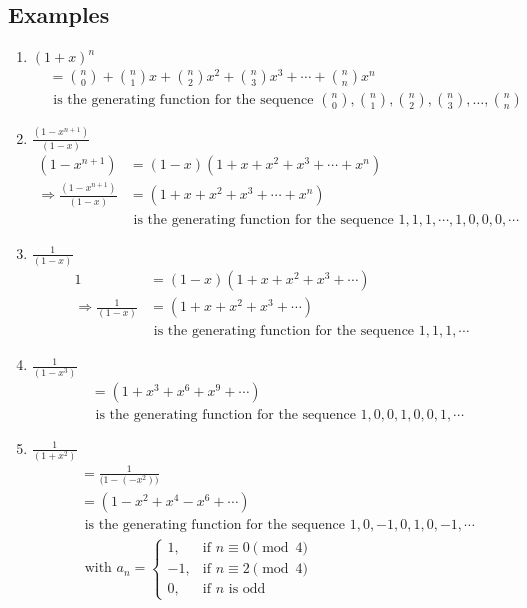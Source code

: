 \documentclass[a4paper]{article}
\begin{document}
\subsection*{Examples}
\begin{enumerate}
    \item $(1+x)^n$
    \begin{align*}
    &=\binom{n}{0}+\binom{n}{1}x+\binom{n}{2}x^2+\binom{n}{3}x^3+\cdots+\binom{n}{n}x^n\\
    &\text{ is the generating function for the sequence } \binom{n}{0},\binom{n}{1},\binom{n}{2},\binom{n}{3},\ldots,\binom{n}{n}
    \end{align*}
    \item $\frac{(1-x^{n+1})}{(1-x)}$
    \begin{align*}
        (1-x^{n+1})&=(1-x)(1+x+x^2+x^3+\cdots+x^n)\\
        \Rightarrow \frac{(1-x^{n+1})}{(1-x)}&=(1+x+x^2+x^3+\cdots+x^n)\\
        &\text{ is the generating function for the sequence } 1,1,1,\cdots,1,0,0,0,\cdots
    \end{align*}
    
    \item $\frac{1}{(1-x)}$
    \begin{align*}
        1&=(1-x)(1+x+x^2+x^3+\cdots)\\
        \Rightarrow \frac{1}{(1-x)}&=(1+x+x^2+x^3+\cdots)\\
        &\text{ is the generating function for the sequence } 1,1,1,\cdots
    \end{align*}
    
    \item $\frac{1}{(1-x^3)}$
    \begin{align*}
        &=(1+x^3+x^6+x^9+\cdots)\\
        &\text{ is the generating function for the sequence } 1,0,0,1,0,0,1,\cdots
    \end{align*}
    
    \item $\frac{1}{(1+x^2)}$
    \begin{align*}
        &=\frac{1}{\bigl(1-(-x^2)\bigr)}\\
        &=(1-x^2+x^4-x^6+\cdots)\\
        &\text{ is the generating function for the sequence } 1,0,-1,0, 1,0,-1,\cdots\\
        &\text{ with } a_n= 
            \begin{cases}
            1,  & \text{if $n\equiv 0\pmod  4$} \\
            -1,  & \text{if $n\equiv 2\pmod  4$} \\
            0, & \text{if $n$ is odd}
            \end{cases}
    \end{align*}
    

\end{enumerate}
\end{document}
